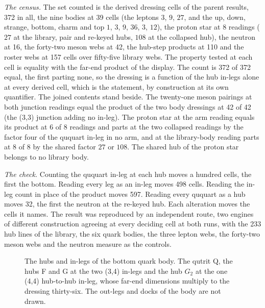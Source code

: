 \begin{chproof}
\textit{The census.} The set counted is the derived dressing cells of the parent results, 372 in all, the nine bodies at 39 cells (the leptons $3$, $9$, $27$, and the up, down, strange, bottom, charm and top $1$, $3$, $9$, $36$, $3$, $12$), the proton star at 8 readings ($27$ at the library, pair and re-keyed hubs, $108$ at the collapsed hub), the neutron at 16, the forty-two meson webs at 42, the hub-step products at 110 and the roster webs at 157 cells over fifty-five library webs. The property tested at each cell is equality with the far-end product of the display. The count is 372 of 372 equal, the first parting none, so the dressing is a function of the hub in-legs alone at every derived cell, which is the statement, by construction at its own quantifier. The joined contents stand beside. The twenty-one meson pairings at both junction readings equal the product of the two body dressings at 42 of 42 (the (3,3) junction adding no in-leg). The proton star at the arm reading equals its product at 6 of 8 readings and parts at the two collapsed readings by the factor four of the ququart in-leg in no arm, and at the library-body reading parts at 8 of 8 by the shared factor $27$ or $108$. The shared hub of the proton star belongs to no library body.

\textit{The check.} Counting the ququart in-leg at each hub moves a hundred cells, the first the bottom. Reading every leg as an in-leg moves 498 cells. Reading the in-leg count in place of the product moves 597. Reading every ququart as a hub moves 32, the first the neutron at the re-keyed hub. Each alteration moves the cells it names. The result was reproduced by an independent route, two engines of different construction agreeing at every deciding cell at both runs, with the 233 hub lines of the library, the six quark bodies, the three lepton webs, the forty-two meson webs and the neutron measure as the controls.
\end{chproof}
\begin{figure}[h]
\centering
{}
\caption{The hubs and in-legs of the bottom quark body. The qutrit Q, the hubs F and G at the two (3,4) in-legs and the hub $G_2$ at the one (4,4) hub-to-hub in-leg, whose far-end dimensions multiply to the dressing thirty-six. The out-legs and docks of the body are not drawn.}
\end{figure}
\par\medskip{}\label{narr:close:8-5}\par
